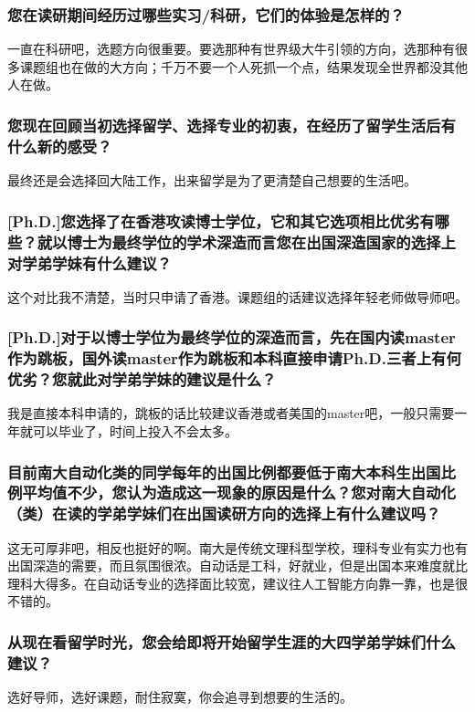 \documentclass[a4paper,UTF8]{book}
\begin{document}
    \subsubsection*{您在读研期间经历过哪些实习/科研，它们的体验是怎样的？}
    一直在科研吧，选题方向很重要。要选那种有世界级大牛引领的方向，选那种有很多课题组也在做的大方向；千万不要一个人死抓一个点，结果发现全世界都没其他人在做。

    \subsubsection*{您现在回顾当初选择留学、选择专业的初衷，在经历了留学生活后有什么新的感受？}
    最终还是会选择回大陆工作，出来留学是为了更清楚自己想要的生活吧。
    
    \subsubsection*{[Ph.D.]您选择了在香港攻读博士学位，它和其它选项相比优劣有哪些？就以博士为最终学位的学术深造而言您在出国深造国家的选择上对学弟学妹有什么建议？}
    这个对比我不清楚，当时只申请了香港。课题组的话建议选择年轻老师做导师吧。

    \subsubsection*{[Ph.D.]对于以博士学位为最终学位的深造而言，先在国内读master作为跳板，国外读master作为跳板和本科直接申请Ph.D.三者上有何优劣？您就此对学弟学妹的建议是什么？}
    我是直接本科申请的，跳板的话比较建议香港或者美国的master吧，一般只需要一年就可以毕业了，时间上投入不会太多。

    \subsubsection*{目前南大自动化类的同学每年的出国比例都要低于南大本科生出国比例平均值不少，您认为造成这一现象的原因是什么？您对南大自动化（类）在读的学弟学妹们在出国读研方向的选择上有什么建议吗？}
    这无可厚非吧，相反也挺好的啊。南大是传统文理科型学校，理科专业有实力也有出国深造的需要，而且氛围很浓。自动话是工科，好就业，但是出国本来难度就比理科大得多。在自动话专业的选择面比较宽，建议往人工智能方向靠一靠，也是很不错的。
    
    \subsubsection*{从现在看留学时光，您会给即将开始留学生涯的大四学弟学妹们什么建议？}
    选好导师，选好课题，耐住寂寞，你会追寻到想要的生活的。
\end{document}
